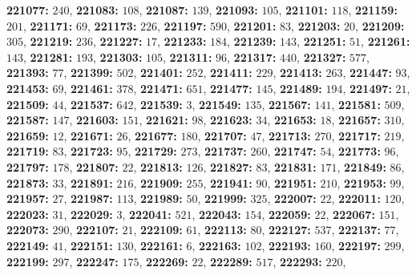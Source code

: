 \textsf{\bfseries 221077:} $240$, \textsf{\bfseries 221083:} $108$, \textsf{\bfseries 221087:} $139$, \textsf{\bfseries 221093:} $105$, \textsf{\bfseries 221101:} $118$, \textsf{\bfseries 221159:} $201$, \textsf{\bfseries 221171:} $69$, \textsf{\bfseries 221173:} $226$, \textsf{\bfseries 221197:} $590$, \textsf{\bfseries 221201:} $83$, \textsf{\bfseries 221203:} $20$, \textsf{\bfseries 221209:} $305$, \textsf{\bfseries 221219:} $236$, \textsf{\bfseries 221227:} $17$, \textsf{\bfseries 221233:} $184$, \textsf{\bfseries 221239:} $143$, \textsf{\bfseries 221251:} $51$, \textsf{\bfseries 221261:} $143$, \textsf{\bfseries 221281:} $193$, \textsf{\bfseries 221303:} $105$, \textsf{\bfseries 221311:} $96$, \textsf{\bfseries 221317:} $440$, \textsf{\bfseries 221327:} $577$, \textsf{\bfseries 221393:} $77$, \textsf{\bfseries 221399:} $502$, \textsf{\bfseries 221401:} $252$, \textsf{\bfseries 221411:} $229$, \textsf{\bfseries 221413:} $263$, \textsf{\bfseries 221447:} $93$, \textsf{\bfseries 221453:} $69$, \textsf{\bfseries 221461:} $378$, \textsf{\bfseries 221471:} $651$, \textsf{\bfseries 221477:} $145$, \textsf{\bfseries 221489:} $194$, \textsf{\bfseries 221497:} $21$, \textsf{\bfseries 221509:} $44$, \textsf{\bfseries 221537:} $642$, \textsf{\bfseries 221539:} $3$, \textsf{\bfseries 221549:} $135$, \textsf{\bfseries 221567:} $141$, \textsf{\bfseries 221581:} $509$, \textsf{\bfseries 221587:} $147$, \textsf{\bfseries 221603:} $151$, \textsf{\bfseries 221621:} $98$, \textsf{\bfseries 221623:} $34$, \textsf{\bfseries 221653:} $18$, \textsf{\bfseries 221657:} $310$, \textsf{\bfseries 221659:} $12$, \textsf{\bfseries 221671:} $26$, \textsf{\bfseries 221677:} $180$, \textsf{\bfseries 221707:} $47$, \textsf{\bfseries 221713:} $270$, \textsf{\bfseries 221717:} $219$, \textsf{\bfseries 221719:} $83$, \textsf{\bfseries 221723:} $95$, \textsf{\bfseries 221729:} $273$, \textsf{\bfseries 221737:} $260$, \textsf{\bfseries 221747:} $54$, \textsf{\bfseries 221773:} $96$, \textsf{\bfseries 221797:} $178$, \textsf{\bfseries 221807:} $22$, \textsf{\bfseries 221813:} $126$, \textsf{\bfseries 221827:} $83$, \textsf{\bfseries 221831:} $171$, \textsf{\bfseries 221849:} $86$, \textsf{\bfseries 221873:} $33$, \textsf{\bfseries 221891:} $216$, \textsf{\bfseries 221909:} $255$, \textsf{\bfseries 221941:} $90$, \textsf{\bfseries 221951:} $210$, \textsf{\bfseries 221953:} $99$, \textsf{\bfseries 221957:} $27$, \textsf{\bfseries 221987:} $113$, \textsf{\bfseries 221989:} $50$, \textsf{\bfseries 221999:} $325$, \textsf{\bfseries 222007:} $22$, \textsf{\bfseries 222011:} $120$, \textsf{\bfseries 222023:} $31$, \textsf{\bfseries 222029:} $3$, \textsf{\bfseries 222041:} $521$, \textsf{\bfseries 222043:} $154$, \textsf{\bfseries 222059:} $22$, \textsf{\bfseries 222067:} $151$, \textsf{\bfseries 222073:} $290$, \textsf{\bfseries 222107:} $21$, \textsf{\bfseries 222109:} $61$, \textsf{\bfseries 222113:} $80$, \textsf{\bfseries 222127:} $537$, \textsf{\bfseries 222137:} $77$, \textsf{\bfseries 222149:} $41$, \textsf{\bfseries 222151:} $130$, \textsf{\bfseries 222161:} $6$, \textsf{\bfseries 222163:} $102$, \textsf{\bfseries 222193:} $160$, \textsf{\bfseries 222197:} $299$, \textsf{\bfseries 222199:} $297$, \textsf{\bfseries 222247:} $175$, \textsf{\bfseries 222269:} $22$, \textsf{\bfseries 222289:} $517$, \textsf{\bfseries 222293:} $220$, 

